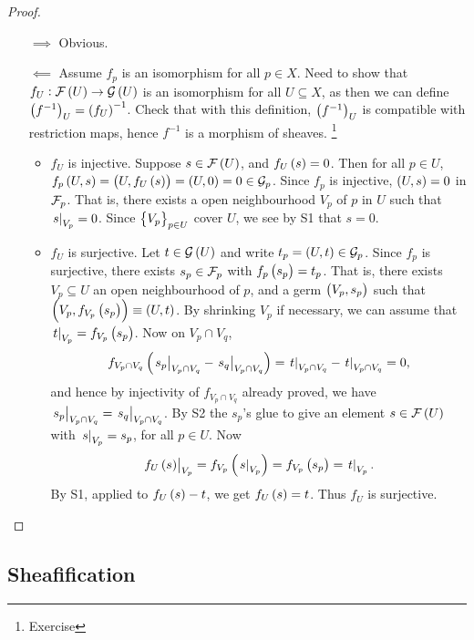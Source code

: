 \begin{proof}
\hfill
\begin{itemize}[leftmargin=0.5in]
\item[$ \implies $] Obvious.
\item[$ \impliedby $] Assume $ f_p $ is an isomorphism for all $ p \in X $. Need to show that $ f_U : \FFF\br{U} \to \GGG\br{U} $ is an isomorphism for all $ U \subseteq X $, as then we can define $ \br{f^{-1}}_U = \br{f_U}^{-1} $. Check that with this definition, $ \br{f^{-1}}_U $ is compatible with restriction maps, hence $ f^{-1} $ is a morphism of sheaves. \footnote{Exercise}
\begin{itemize}
\item $ f_U $ is injective. Suppose $ s \in \FFF\br{U} $, and $ f_U\br{s} = 0 $. Then for all $ p \in U $, $ f_p\br{U, s} = \br{U, f_U\br{s}} = \br{U, 0} = 0 \in \GGG_p $. Since $ f_p $ is injective, $ \br{U, s} = 0 $ in $ \mathcal{F}_p $. That is, there exists a open neighbourhood $ V_p $ of $ p $ in $ U $ such that $ \left. s \right|_{V_p} = 0 $. Since $ \cbr{V_p}_{p \in U} $ cover $ U $, we see by S1 that $ s = 0 $.
\item $ f_U $ is surjective. Let $ t \in \GGG\br{U} $ and write $ t_p = \br{U, t} \in \GGG_p $. Since $ f_p $ is surjective, there exists $ s_p \in \mathcal{F}_p $ with $ f_p\br{s_p} = t_p $. That is, there exists $ V_p \subseteq U $ an open neighbourhood of $ p $, and a germ $ \br{V_p, s_p} $ such that $ \br{V_p, f_{V_p}\br{s_p}} \equiv \br{U, t} $. By shrinking $ V_p $ if necessary, we can assume that $ \eval{t}_{V_p} = f_{V_p}\br{s_p} $. Now on $ V_p \cap V_q $,
$$ f_{V_p \cap V_q}\br{\eval{s_p}_{V_p \cap V_q} - \eval{s_q}_{V_p \cap V_q}} = \eval{t}_{V_p \cap V_q} - \eval{t}_{V_p \cap V_q} = 0, $$
and hence by injectivity of $ f_{V_p \cap V_q} $ already proved, we have $ \left. s_p \right|_{V_p \cap V_q} = \left. s_q \right|_{V_p \cap V_q} $. By S2 the $ s_p $'s glue to give an element $ s \in \FFF\br{U} $ with $ \left. s \right|_{V_p} = s_p $, for all $ p \in U $. Now
$$ \eval{f_U\br{s}}_{V_p} = f_{V_p}\br{\eval{s}_{V_p}} = f_{V_p}\br{s_p} = \eval{t}_{V_p}. $$
By S1, applied to $ f_U\br{s} - t $, we get $ f_U\br{s} = t $. Thus $ f_U $ is surjective.
\end{itemize}
\end{itemize}
\end{proof}

\subsection{Sheafification}

